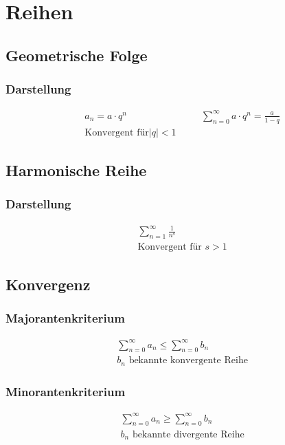\section{Reihen}
\subsection{Geometrische Folge}

\subsubsection*{Darstellung}

\begin{alignat*}{2}
&a_n = a \cdot q^n &\quad& \sum_{n=0}^\infty a \cdot q^n = \frac{a}{1-q} \\
&\text{Konvergent für} \left| q \right| < 1 
\end{alignat*}

\subsection{Harmonische Reihe}

\subsubsection*{Darstellung}

\begin{align*}
&\sum_{n=1}^\infty \frac{1}{n^s} \\
&\text{Konvergent für } s > 1
\end{align*}

\newpage
\subsection{Konvergenz}

\begin{multicols}{2}
\subsubsection*{Majorantenkriterium}
\begin{align*}
&\sum_{n=0}^\infty a_n\leq\sum_{n=0}^\infty b_n \\
& b_n \text{ bekannte konvergente Reihe}
\end{align*}

\subsubsection*{Minorantenkriterium}
\begin{align*}
&\sum_{n=0}^\infty a_n\geq\sum_{n=0}^\infty b_n \\
& b_n \text{ bekannte divergente Reihe}
\end{align*}
\end{multicols}


